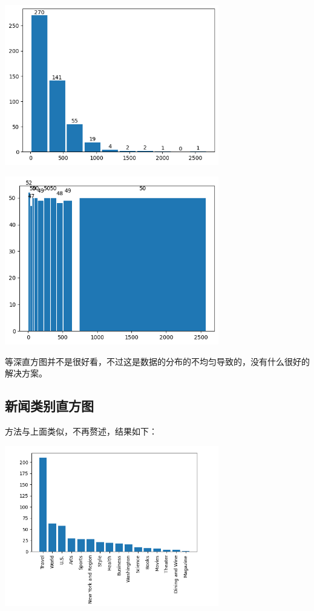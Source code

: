 \documentclass[12pt, UTF8]{article}
\begin{document}
\begin{center}
  \includegraphics[width=0.7\textwidth]{wordcnt_hist0.png}
\end{center}

\begin{center}
  \includegraphics[width=0.7\textwidth]{wordcnt_hist1.png}
\end{center}

等深直方图并不是很好看，不过这是数据的分布的不均匀导致的，没有什么很好的解决方案。

\subsection{新闻类别直方图}
方法与上面类似，不再赘述，结果如下：

\begin{center}
  \includegraphics[width=0.7\textwidth]{classifier_hist.png}
\end{center}
\end{document}
